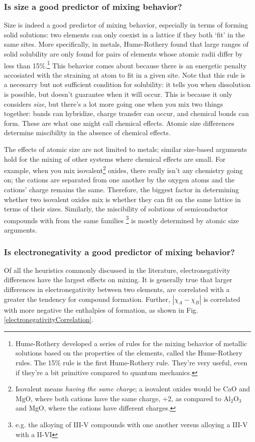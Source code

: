 \documentclass[12pt]{article}
\begin{document}
\subsubsection{Is size a good predictor of mixing behavior?}
Size is indeed a good predictor of mixing behavior, especially in terms of forming solid solutions: two elements can only coexist in a lattice if they both `fit' in the same sites. More specifically, in metals, Hume-Rothery found that large ranges of solid solubility are only found for pairs of elements whose  atomic radii differ by less than 15\%.\footnote{Hume-Rothery developed a series of rules for the mixing behavior of metallic solutions based on the properties of the elements, called the Hume-Rothery rules. The 15\% rule is the first Hume-Rothery rule. They're very useful, even if they're a bit primitive compared to quantum mechanics.} This behavior comes about because there is an energetic penalty accosiated with the straining at atom to fit in a given site. Note that this rule is a necesarry but not sufficient condition for solubility: it tells you when dissolution is possible, but doesn't guarantee when it will occur. This is because it only considers \emph{size}, but there's a lot more going one when you mix two things together: bands can hybridize, charge transfer can occur, and chemical bonds can form. These are what one might call chemical effects. Atomic size differences determine miscibility in the absence of chemical effects.

The effects of atomic size are not limited to metals; similar size-based arguments hold for the mixing of other systems where chemical effects are small. For example, when you mix isovalent\footnote{Isovalent means \emph{having the same charge}; a isovalent oxides would be CaO and MgO, where both cations have the same charge, +2, as compared to Al$_2$O$_3$ and MgO, where the cations have different charges.} oxides, there really isn't any chemistry going on; the cations are separated from one another by the oxygen atoms and the cations' charge remains the same. Therefore, the biggest factor in determining whether two isovalent oxides mix is whether they can fit on the same lattice in terms of their sizes. Similarly, the miscibility of solutions of semiconductor compounds with from the same families \footnote{e.g. the alloying of III-V compounds with one another versus alloying a III-V with a II-VI} is mostly determined by atomic size arguments.

\subsubsection{Is electronegativity a good predictor of mixing behavior?}
Of all the heuristics commonly discussed in the literature, electronegativity differences have the largest effects on mixing.
It is generally true that larger differences in electronegativity between two elements, are correlated with a greater the tendency for compound formation. Further, $|\chi_A - \chi_B|$ is correlated with more negative the enthalpies of formation, as shown in Fig. \ref{electronegativityCorrelation}. 
\end{document}
